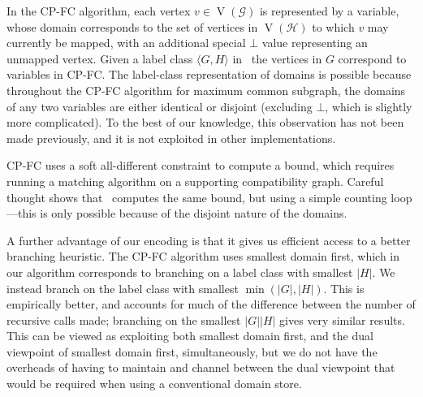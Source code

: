 \documentclass[letterpaper]{article}
\newcommand{\citep}[1]{\cite{#1}}
\newcommand{\McSplit}{\textproc{McSplit}}
\newcommand{\graphG}{\mathcal{G}}
\newcommand{\graphH}{\mathcal{H}}
\newcommand{\setG}{G}
\newcommand{\setH}{H}
\newcommand{\linerangeref}[2]{\count255=\ref{#1}\advance\count255 by 1 \ifnum\count255=\ref{#2}lines~\ref{#1} and~\ref{#2}\else lines~\ref{#1} to~\ref{#2}\fi}
\DeclareMathOperator{\V}{V}
\DeclareMathOperator{\N}{N}
\DeclareMathOperator{\invN}{\overline{N}}
\begin{document}
In the CP-FC algorithm, each vertex $v \in \V(\graphG)$ is represented by a
variable, whose domain corresponds to the set of vertices in $\V(\graphH)$ to which
$v$ may currently be mapped, with an additional special $\bot$ value
representing an unmapped vertex.
Given a label class $\langle \setG,\setH \rangle$ in \McSplit\, the vertices in $\setG$
correspond to variables in CP-FC. The label-class representation of domains is
possible because throughout the CP-FC algorithm for maximum common subgraph, the
domains of any two variables are either identical or disjoint (excluding
$\bot$, which is slightly more complicated). To the best of our knowledge, this
observation has not been made previously, and it is not exploited in other
implementations.

CP-FC uses a soft all-different constraint to compute a bound, which requires
running a matching algorithm on a supporting compatibility graph.  Careful
thought shows that \McSplit\ computes the same bound, but using a simple
counting loop---this is only possible because of the disjoint nature of the
domains.


A further advantage of our encoding is that it gives us efficient access to a
better branching heuristic. The CP-FC algorithm uses smallest domain first,
which in our algorithm corresponds to branching on a label class with smallest
$|\setH|$. We instead branch on the label class with smallest $\min(|\setG|,|\setH|)$.
This is empirically better, and accounts for much of the difference between
the number of recursive calls made; branching on the smallest $|\setG| |\setH|$ gives
very similar results. This can be viewed as exploiting both smallest domain first,
and the dual viewpoint \citep{DBLP:conf/ecai/Geelen92} of smallest domain
first, simultaneously, but we do not have the overheads of having to maintain
and channel between the dual viewpoint that would be required when using a
conventional domain store.
\end{document}
